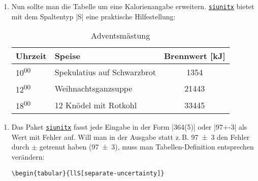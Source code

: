 \documentclass{scrartcl}
\newcommand{\pkg}[1]{\href{http://ctan.org/pkg/#1}{\texttt{#1}}}
\newcommand\zeit[2]{#1\textsuperscript{#2}}
\begin{document}
\newsavebox{\SolutionCodeC}
\begin{lrbox}{\SolutionCodeC}
\begin{minipage}{\textwidth}
\begin{enumerate}[label=\alph*)]\addtocounter{enumi}{2}
\item Nun sollte man die Tabelle um eine Kalorienangabe erweitern. \pkg{siunitx} bietet mit dem Spaltentyp |S| eine praktische Hilfestellung:

\begin{LTXexample}[pos=b,preset=\centering]
\begin{table}
  \centering
  \begin{tabular}{llS}
    \toprule
    {\textbf{Uhrzeit}}  &  {\textbf{Speise}} & \textbf{Brennwert} [\si{\kilo\joule}] \\
    \midrule 
    \zeit{10}{00}       &  Spekulatius auf Schwarzbrot & 1354 \\ 
    \zeit{12}{00}       &  Weihnachtsganzsuppe         & 21443 \\
    \zeit{18}{00}       &  12 Knödel mit Rotkohl       & 33445 \\
    \bottomrule
  \end{tabular}
  \caption{Adventsmästung}
  \label{tab:essen}
\end{table}
\end{LTXexample}

\end{enumerate}
\end{minipage}
\end{lrbox}

\newsavebox{\SolutionCodeD}
\begin{lrbox}{\SolutionCodeD}
\begin{minipage}{\textwidth}
\begin{enumerate}[label=\alph*)]\addtocounter{enumi}{3}

\item Das Paket \pkg{siunitx} fasst jede Eingabe in der Form |364(5)| oder |97+-3| als Wert mit Fehler auf. Will man in der Ausgabe statt z.\,B. \num{97(3)} den Fehler durch $\pm$ getrennt haben (\num[separate-uncertainty]{97(3)}), muss man Tabellen-Definition entsprechen verändern:
\begin{lstlisting}
\begin{tabular}{llS[separate-uncertainty]}
\end{lstlisting}
\end{enumerate}
\end{minipage}
\end{lrbox}
\end{document}
